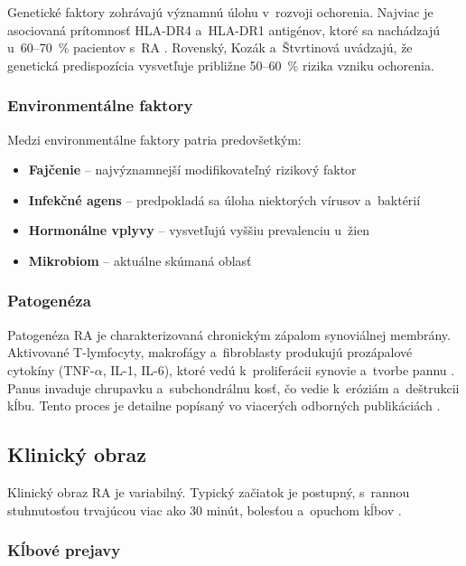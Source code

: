 Genetické faktory zohrávajú významnú úlohu v~rozvoji ochorenia. Najviac je asociovaná prítomnosť HLA-DR4 a~HLA-DR1 antigénov, ktoré sa nachádzajú u~60--70~\% pacientov s~RA \parencite{firestein2021}. Rovenský, Kozák a~Štvrtinová \parencite*{Rovensky2015} uvádzajú, že genetická predispozícia vysvetľuje približne 50--60~\% rizika vzniku ochorenia.

\subsubsection{Environmentálne faktory}

Medzi environmentálne faktory patria predovšetkým:
\begin{itemize}
    \item \textbf{Fajčenie} -- najvýznamnejší modifikovateľný rizikový faktor
    \item \textbf{Infekčné agens} -- predpokladá sa úloha niektorých vírusov a~baktérií
    \item \textbf{Hormonálne vplyvy} -- vysvetľujú vyššiu prevalenciu u~žien
    \item \textbf{Mikrobiom} -- aktuálne skúmaná oblasť \parencite{smolen2018}
\end{itemize}

\subsubsection{Patogenéza}

Patogenéza RA je charakterizovaná chronickým zápalom synoviálnej membrány. Aktivované T-lymfocyty, makrofágy a~fibroblasty produkujú prozápalové cytokíny (TNF-$\alpha$, IL-1, IL-6), ktoré vedú k~proliferácii synovie a~tvorbe pannu \parencite{Macejova2019}. Panus invaduje chrupavku a~subchondrálnu kosť, čo vedie k~eróziám a~deštrukcii kĺbu. Tento proces je detailne popísaný vo viacerých odborných publikáciách \parencite{pavelka2018, Olejarova2016}.

\subsection{Klinický obraz}

Klinický obraz RA je variabilný. Typický začiatok je postupný, s~rannou stuhnutosťou trvajúcou viac ako 30 minút, bolesťou a~opuchom kĺbov \parencite{Macejova2019}.

\subsubsection{Kĺbové prejavy}

